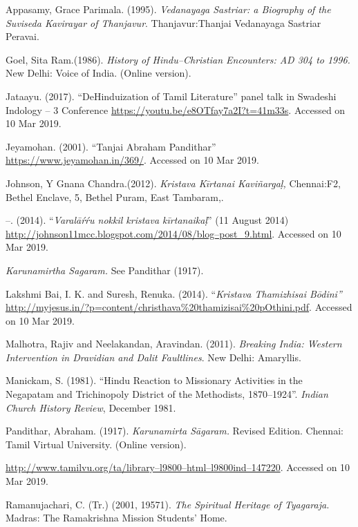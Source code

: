 \begin{thebibliography}{99}
 Appasamy, Grace Parimala. (1995). \textit{Vedanayaga Sastriar: a Biography of the Suviseda Kavirayar of Thanjavur}. Thanjavur:Thanjai Vedanayaga Sastriar Peravai.

  Goel, Sita Ram.(1986).\textit{ History of Hindu–Christian Encounters: AD 304 to 1996. }New Delhi: Voice of India. (Online version).

  Jataayu. (2017). “DeHinduization of Tamil Literature” panel talk in Swadeshi Indology – 3 Conference \url{https://youtu.be/e8OTfay7a2I?t=41m33s}. Accessed on 10 Mar 2019.

  Jeyamohan. (2001). “Tanjai Abraham Pandithar” \url{https://www.jeyamohan.in/369/}. Accessed on 10 Mar 2019.

  Johnson, Y Gnana Chandra.(2012).\textit{ Kristava Kīrtanai Kaviñargaḷ, }Chennai:F2, Bethel Enclave, 5, Bethel Puram, East Tambaram,.

  –. (2014). “\textit{Varalāŕŕu nokkil kristava kīrtanaikaḷ}” (11 August 2014) \url{http://johnson11mcc.blogspot.com/2014/08/blog–post_9.html}. Accessed on 10 Mar 2019.

  \textit{Karunamirtha Sagaram. }See Pandithar (1917).

  Lakshmi Bai, I. K. and Suresh, Renuka. (2014). “\textit{Kristava Thamizhisai Bōdini”} \url{http://myjesus.in/?p=content/christhava%20thamizisai%20pOthini.pdf}. Accessed on 10 Mar 2019.

  Malhotra, Rajiv and Neelakandan, Aravindan. (2011). \textit{Breaking India: Western Intervention in Dravidian and Dalit Faultlines}. New Delhi: Amaryllis.

  Manickam, S. (1981). “Hindu Reaction to Missionary Activities in the Negapatam and Trichinopoly District of the Methodists, 1870–1924”. \textit{Indian Church History Review}, December 1981.

  Pandithar, Abraham. (1917). \textit{Karunamirta Sāgaram. }Revised Edition. Chennai: Tamil Virtual University. (Online version).

  \url{http://www.tamilvu.org/ta/library–l9800–html–l9800ind–147220}. Accessed on 10 Mar 2019.

  Ramanujachari, C. (Tr.) (2001, 19571). \textit{The Spiritual Heritage of Tyagaraja. }Madras: The Ramakrishna Mission Students’ Home.


\end{thebibliography}
